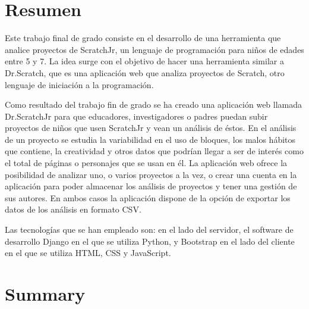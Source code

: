 \documentclass[a4paper, 12pt]{book}
\begin{document}

\chapter*{Resumen}

Este trabajo final de grado consiste en el desarrollo de una herramienta que analice proyectos de ScratchJr, un lenguaje de programación para niños de edades entre 5 y 7.  
La idea surge con el objetivo de hacer una herramienta similar a Dr.Scratch, que es una aplicación web que analiza proyectos de Scratch, otro lenguaje de iniciación a la programación. 

\vspace{5mm}

Como resultado del trabajo fin de grado se ha creado una aplicación web llamada Dr.ScratchJr para que educadores, investigadores o padres puedan subir proyectos de niños que usen ScratchJr y vean un análisis de éstos.
En el análisis de un proyecto se estudia la variabilidad en el uso de bloques, los malos hábitos que contiene, la creatividad y otros datos que podrían llegar a ser de interés como el total de páginas o personajes que se usan en él. 
La aplicación web ofrece la posibilidad de analizar uno, o varios proyectos a la vez, o crear una cuenta en la aplicación para poder almacenar los análisis de proyectos y tener una gestión de sus autores. 
En ambos casos la aplicación dispone de la opción de exportar los datos de los análisis en formato CSV.

\vspace{5mm}

Las tecnologías que se han empleado son: en el lado del servidor, el software de desarrollo Django en el que se utiliza Python, y Bootstrap en el lado del cliente en el que se utiliza HTML, CSS y JavaScript.


\chapter*{Summary}
\end{document}
